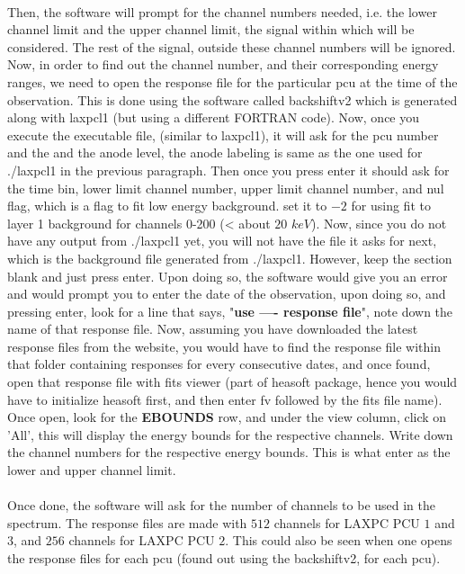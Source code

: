 \documentclass[a4paper,twoside]{report}
\numberwithin{equation}{section}
\begin{document}
\paragraph{}
Then, the software will prompt for the channel numbers needed, i.e. the lower channel limit and the upper channel limit, the signal within which will be considered. The rest of the signal, outside these channel numbers will be ignored. Now, in order to find out the channel number, and their corresponding energy ranges, we need to open the response file for the particular pcu at the time of the observation. This is done using the software called backshiftv2 which is generated along with laxpcl1 (but using a different FORTRAN code). Now, once you execute the executable file, (similar to laxpcl1), it will ask for the pcu number and the and the anode level, the anode labeling is same as the one used for ./laxpcl1 in the previous paragraph. Then once you press enter it should ask for the time bin, lower limit channel number, upper limit channel number, and nul flag, which is a flag to fit low energy background. set it to $-2$ for using fit to layer 1 background for channels 0-200 (< about $20$ $keV$). Now, since you do not have any output from ./laxpcl1 yet, you will not have the file it asks for next, which is the background file generated from ./laxpcl1. However, keep the section blank and just press enter. Upon doing so, the software would give you an error and would prompt you to enter the date of the observation, upon doing so, and pressing enter, look for a line that says, "\textbf{use ---- response file}", note down the name of that response file. Now, assuming you have downloaded the latest response files from the website, you would have to find the response file within that folder containing responses for every consecutive dates, and once found, open that response file with fits viewer (part of heasoft package, hence you would have to initialize heasoft first, and then enter fv followed by the fits file name). Once open, look for the \textbf{EBOUNDS} row, and under the view column, click on 'All', this will display the energy bounds for the respective channels. Write down the channel numbers for the respective energy bounds. This is what enter as the lower and upper channel limit. 
\paragraph{}
Once done, the software will ask for the number of channels to be used in the spectrum. The response files are made with $512$ channels for LAXPC PCU $1$ and $3$, and $256$ channels for LAXPC PCU $2$. This could also be seen when one opens the response files for each pcu (found out using the backshiftv2, for each pcu). 
\end{document}
